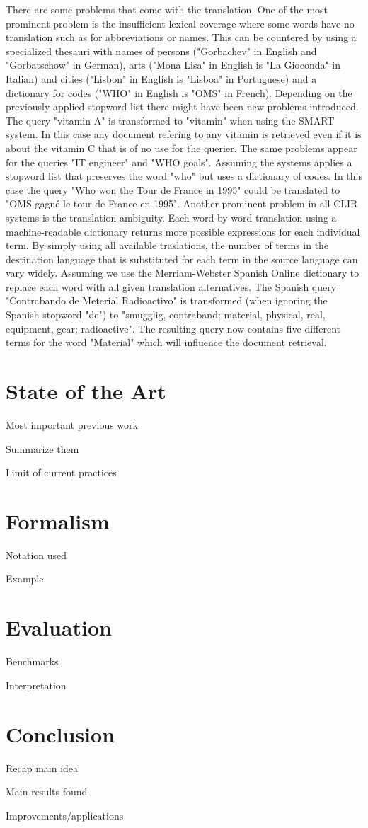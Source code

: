 \documentclass[journal]{IEEEtran}
\begin{document}
There are some problems that come with the translation.
One of the most prominent problem is the insufficient lexical coverage where some words have no translation such as for abbreviations or names.
This can be countered by using a specialized thesauri with names of persons ("Gorbachev" in English and "Gorbatschow" in German), arts ("Mona Lisa" in English is "La Gioconda" in Italian) and cities ("Lisbon" in English is "Lisboa" in Portuguese) and a dictionary for codes ("WHO" in English is "OMS" in French).
Depending on the previously applied stopword list there might have been new problems introduced.
The query "vitamin A" is transformed to "vitamin" when using the SMART system.
In this case any document refering to any vitamin is retrieved even if it is about the vitamin C that is of no use for the querier.
The same problems appear for the queries "IT engineer" and "WHO goals".
Assuming the systems applies a stopword list that preserves the word "who" but uses a dictionary of codes.
In this case the query "Who won the Tour de France in 1995" could be translated to "OMS gagn\'{e} le tour de France en 1995".
Another prominent problem in all CLIR systems is the translation ambiguity.
Each word-by-word translation using a machine-readable dictionary returns more possible expressions for each individual term.
By simply using all available traslations, the number of terms in the destination language that is substituted for each term in the source language can vary widely.
Assuming we use the Merriam-Webster Spanish Online dictionary to replace each word with all given translation alternatives.
The Spanish query "Contrabando de Meterial Radioactivo" is transformed (when ignoring the Spanish stopword "de") to "smugglig, contraband; material, physical, real, equipment, gear; radioactive".
The resulting query now contains five different terms for the word "Material" which will influence the document retrieval.

\section{State of the Art}

Most important previous work

Summarize them

Limit of current practices



\section{Formalism}
Notation used

Example



\section{Evaluation}
Benchmarks

Interpretation



\section{Conclusion}
Recap main idea

Main results found

Improvements/applications

\cite{gollins01}
\cite{peters12}
\cite{savoy09}
\cite{yu09}



\end{document}
